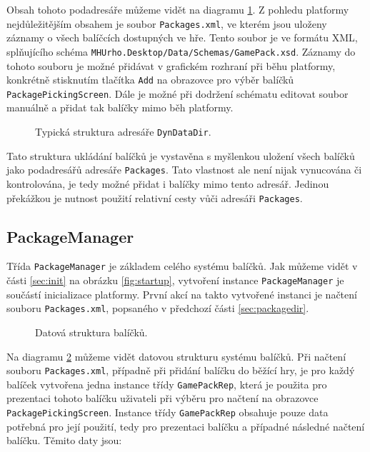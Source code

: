Obsah tohoto podadresáře můžeme vidět na diagramu \ref{fig:packagesdir}. Z pohledu platformy nejdůležitějším obsahem je soubor \texttt{Packages.xml}, ve kterém jsou uloženy záznamy o všech balíčcích dostupných ve hře. Tento soubor je ve formátu XML, splňujícího schéma \texttt{MHUrho.Desktop/Data/Schemas/GamePack.xsd}. Záznamy do tohoto souboru je možné přidávat v grafickém rozhraní při běhu platformy, konkrétně stisknutím tlačítka \texttt{Add} na obrazovce pro výběr balíčků \texttt{PackagePickingScreen}. Dále je možné při dodržení schématu editovat soubor manuálně a přidat tak balíčky mimo běh platformy. 

\begin{figure}[h]
	\centering
	\def\svgwidth{\textwidth}
	
	\caption{Typická struktura adresáře \texttt{DynDataDir}.}
	\label{fig:packagesdir}
\end{figure}

Tato struktura ukládání balíčků je vystavěna s myšlenkou uložení všech balíčků jako podadresářů adresáře \texttt{Packages}. Tato vlastnost ale není nijak vynucována či kontrolována, je tedy možné přidat i balíčky mimo tento adresář. Jedinou překážkou je nutnost použití relativní cesty vůči adresáři \texttt{Packages}.

\subsection{PackageManager}
\label{sec:packagemanager}
Třída \texttt{PackageManager} je základem celého systému balíčků. Jak můžeme vidět v části \ref{sec:init} na obrázku \ref{fig:startup}, vytvoření instance \texttt{PackageManager} je součástí inicializace platformy. První akcí na takto vytvořené instanci je načtení souboru \texttt{Packages.xml}, popsaného v předchozí části \ref{sec:packagedir}.

\begin{figure}[h]
	\centering
	\fontsize{8pt}{11pt}\selectfont
	\def\svgwidth{\textwidth}
	
	\caption{Datová struktura balíčků.}
	\label{fig:packagemanager}
\end{figure}

Na diagramu \ref{fig:packagemanager} můžeme vidět datovou strukturu systému balíčků. Při načtení souboru \texttt{Packages.xml}, případně při přidání balíčku do běžící hry, je pro každý balíček vytvořena jedna instance třídy \texttt{GamePackRep}, která je použita pro prezentaci tohoto balíčku uživateli při výběru pro načtení na obrazovce \texttt{PackagePickingScreen}. Instance třídy \texttt{GamePackRep} obsahuje pouze data potřebná pro její použití, tedy pro prezentaci balíčku a případné následné načtení balíčku. Těmito daty jsou:

